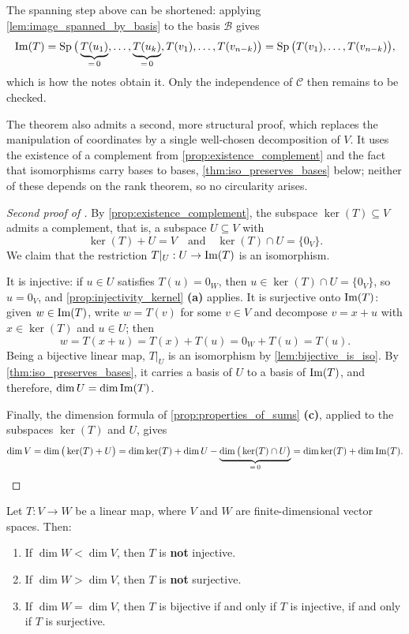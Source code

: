 \begin{remark}
The spanning step above can be shortened: applying \cref{lem:image_spanned_by_basis} to the basis $\mathcal{B}$ gives
\[
\operatorname{Im}(T) = \operatorname{Sp}\big(\underbrace{T(u_1)}_{= \, 0}, \dots, \underbrace{T(u_k)}_{= \, 0}, T(v_1), \dots, T(v_{n-k})\big) = \operatorname{Sp}\big(T(v_1), \dots, T(v_{n-k})\big),
\]
which is how the notes obtain it. Only the independence of $\mathcal{C}$ then remains to be checked.
\end{remark}

The theorem also admits a second, more structural proof, which replaces the manipulation of coordinates by a single well-chosen decomposition of $V$. It uses the existence of a complement from \cref{prop:existence_complement} and the fact that isomorphisms carry bases to bases, \cref{thm:iso_preserves_bases} below; neither of these depends on the rank theorem, so no circularity arises.

\begin{proof}[Second proof of ]
By \cref{prop:existence_complement}, the subspace $\ker(T) \subseteq V$ admits a complement, that is, a subspace $U \subseteq V$ with
\[
\ker(T) + U = V \quad \text{and} \quad \ker(T) \cap U = \{0_V\}.
\]
We claim that the restriction $T|_U: U \to \operatorname{Im}(T)$ is an isomorphism.

It is injective: if $u \in U$ satisfies $T(u) = 0_W$, then $u \in \ker(T) \cap U = \{0_V\}$, so $u = 0_V$, and \cref{prop:injectivity_kernel} \textbf{(a)} applies. It is surjective onto $\operatorname{Im}(T)$: given $w \in \operatorname{Im}(T)$, write $w = T(v)$ for some $v \in V$ and decompose $v = x + u$ with $x \in \ker(T)$ and $u \in U$; then
\[
w = T(x + u) = T(x) + T(u) = 0_W + T(u) = T(u).
\]
Being a bijective linear map, $T|_U$ is an isomorphism by \cref{lem:bijective_is_iso}. By \cref{thm:iso_preserves_bases}, it carries a basis of $U$ to a basis of $\operatorname{Im}(T)$, and therefore, $\dim U = \dim \operatorname{Im}(T)$.

Finally, the dimension formula of \cref{prop:properties_of_sums} \textbf{(c)}, applied to the subspaces $\ker(T)$ and $U$, gives
\[
\dim V = \dim\big(\ker(T) + U\big) = \dim \ker(T) + \dim U - \underbrace{\dim\big(\ker(T) \cap U\big)}_{= \, 0} = \dim \ker(T) + \dim \operatorname{Im}(T). \qedhere
\]
\end{proof}

\begin{corollary}
\label{cor:equal_dim_iso}
Let $T: V \to W$ be a linear map, where $V$ and $W$ are finite-di\-men\-sional vector spaces. Then:
\begin{enumerate}[label=\textbf{(\alph*)}]
    \item If $\dim W < \dim V$, then $T$ is \textbf{not} injective.
    \item If $\dim W > \dim V$, then $T$ is \textbf{not} surjective.
    \item If $\dim W = \dim V$, then $T$ is bijective if and only if $T$ is injective, if and only if $T$ is surjective.
\end{enumerate}
\end{corollary}

